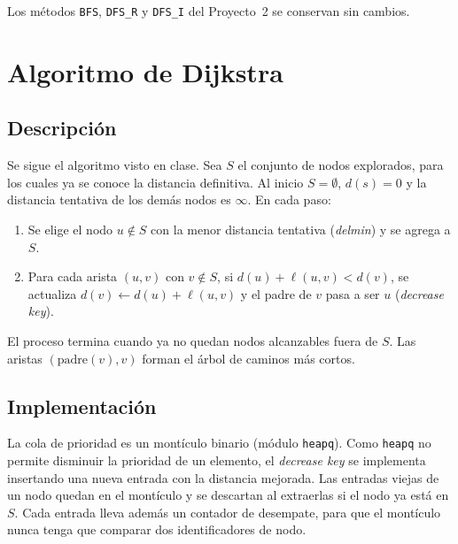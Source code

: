 \documentclass[11pt,letterpaper]{article}
\begin{document}
Los métodos \texttt{BFS}, \texttt{DFS\_R} y \texttt{DFS\_I} del Proyecto~2 se
conservan sin cambios.

\section{Algoritmo de Dijkstra}

\subsection{Descripción}

Se sigue el algoritmo visto en clase. Sea $S$ el conjunto de nodos explorados,
para los cuales ya se conoce la distancia definitiva. Al inicio $S = \emptyset$,
$d(s) = 0$ y la distancia tentativa de los demás nodos es $\infty$. En cada paso:

\begin{enumerate}
    \item Se elige el nodo $u \notin S$ con la menor distancia tentativa
          (\emph{delmin}) y se agrega a $S$.
    \item Para cada arista $(u, v)$ con $v \notin S$, si
          $d(u) + \ell(u, v) < d(v)$, se actualiza $d(v) \leftarrow d(u) + \ell(u, v)$
          y el padre de $v$ pasa a ser $u$ (\emph{decrease key}).
\end{enumerate}

El proceso termina cuando ya no quedan nodos alcanzables fuera de $S$. Las aristas
$(\text{padre}(v), v)$ forman el árbol de caminos más cortos.

\subsection{Implementación}

La cola de prioridad es un montículo binario (módulo \texttt{heapq}). Como
\texttt{heapq} no permite disminuir la prioridad de un elemento, el \emph{decrease
key} se implementa insertando una nueva entrada con la distancia mejorada. Las
entradas viejas de un nodo quedan en el montículo y se descartan al extraerlas si
el nodo ya está en $S$. Cada entrada lleva además un contador de desempate, para
que el montículo nunca tenga que comparar dos identificadores de nodo.
\end{document}

